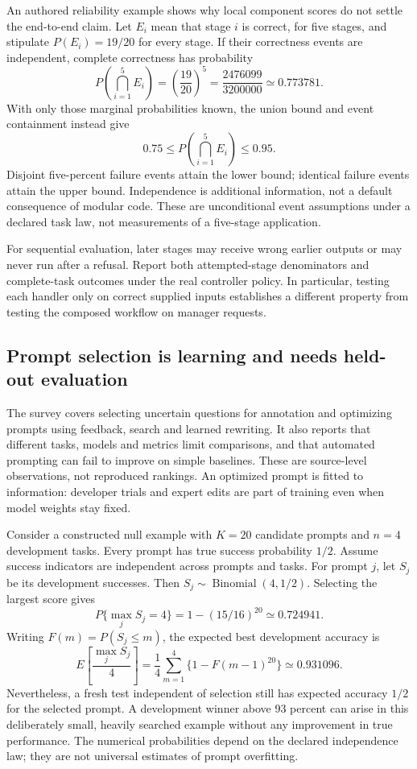 An authored reliability example shows why local component scores do not settle
the end-to-end claim. Let $E_i$ mean that stage $i$ is correct, for five stages,
and stipulate $P(E_i)=19/20$ for every stage. If their correctness events are
independent, complete correctness has probability
\[
 P\!\left(\bigcap_{i=1}^{5}E_i\right)
     =\left(\frac{19}{20}\right)^5
     =\frac{2476099}{3200000}\simeq0.773781.
\]
With only those marginal probabilities known, the union bound and event
containment instead give
\[
 0.75\leq P\!\left(\bigcap_{i=1}^{5}E_i\right)\leq0.95.
\]
Disjoint five-percent failure events attain the lower bound; identical failure
events attain the upper bound. Independence is additional information, not a
default consequence of modular code. These are unconditional event assumptions
under a declared task law, not measurements of a five-stage application.
\citep{exec24_promptengineering_reference}

For sequential evaluation, later stages may receive wrong earlier outputs or
may never run after a refusal. Report both attempted-stage denominators and
complete-task outcomes under the real controller policy. In particular,
testing each handler only on correct supplied inputs establishes a different
property from testing the composed workflow on manager requests.

\subsection{Prompt selection is learning and needs held-out evaluation}

The survey covers selecting uncertain questions for annotation and optimizing
prompts using feedback, search and learned rewriting. It also reports that
different tasks, models and metrics limit comparisons, and that automated
prompting can fail to improve on simple baselines. These are source-level
observations, not reproduced rankings. An optimized prompt is fitted to
information: developer trials and expert edits are part of training even when
model weights stay fixed.~\citep{exec24_promptengineering_original}

Consider a constructed null example with $K=20$ candidate prompts and $n=4$
development tasks. Every prompt has true success probability $1/2$. Assume
success indicators are independent across prompts and tasks. For prompt $j$,
let $S_j$ be its development successes. Then $S_j\sim\operatorname{Binomial}(4,1/2)$.
Selecting the largest score gives
\[
 P\{\max_j S_j=4\}=1-(15/16)^{20}\simeq0.724941.
\]
Writing $F(m)=P(S_j\leq m)$, the expected best development accuracy is
\[
 E\!\left[\frac{\max_j S_j}{4}\right]
 =\frac14\sum_{m=1}^{4}\{1-F(m-1)^{20}\}
 \simeq0.931096.
\]
Nevertheless, a fresh test independent of selection still has expected
accuracy $1/2$ for the selected prompt. A development winner above 93 percent
can arise in this deliberately small, heavily searched example without any
improvement in true performance. The numerical probabilities depend on the
declared independence law; they are not universal estimates of prompt overfitting.
\citep{exec24_promptengineering_reference}

